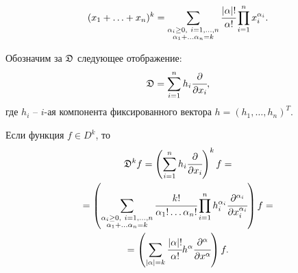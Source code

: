 	\begin{theorem}
		$$
			(x_1 + \ldots + x_n)^k = \sum \limits_{\substack{\alpha_i \ge 0,\ i=1,\ldots,n \\ \alpha_1+\dots\alpha_n=k}} \cfrac {|\alpha|!}{\alpha!} \prod\limits_{i=1}^n x_i^{\alpha_i}.
		$$
	\end{theorem}

	\begin{example}
		Обозначим за $\mathfrak{D}$ следующее отображение:
		$$
			\mathfrak{D} = \sum\limits_{i=1}^n h_i \cfrac {\partial} {\partial x_i},
		$$
		где $h_i$ -- $i$-ая компонента фиксированного вектора $h = (h_1, \ldots, h_n)^T$.
		
		Если функция $f \in D^k$, то 
		\begin{multline*}
			\mfrk{D}^k f = \left( \sum\limits_{i=1}^n h_i \cfrac{\partial} {\partial x_i} \right)^k f =\\
			= \left( \sum\limits_{\substack{\alpha_i \ge 0,\ i=1,\ldots,n \\ \alpha_1+\dots\alpha_n=k}} \cfrac {k!}{\alpha_1!\dots \alpha_n!} \prod\limits_{i=1}^n h_i^{\alpha_i}\cfrac {\partial^{\alpha_i}}{\partial x_i^{\alpha_i}} \right)f =\\
			= \left(\sum\limits_{|\alpha|=k} \cfrac{|\alpha|!}{\alpha!} h^{\alpha} \cfrac {\partial^{\alpha}}{\partial x^{\alpha}}\right) f.
		\end{multline*}
	\end{example}

